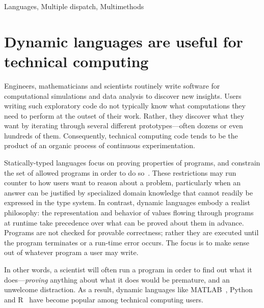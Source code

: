 \documentclass[10pt, preprint]{sigplanconf}
\begin{document}

\terms Languages, Multiple dispatch, Multimethods


\section{Dynamic languages are useful for technical computing}

Engineers, mathematicians and scientists routinely write software for
computational simulations and data analysis to discover new insights.
Users writing such exploratory code do not typically
know what computations they need to perform at the outset of their work.
Rather, they discover what they want by iterating through several different
prototypes---often dozens or even hundreds of them. Consequently, technical
computing code tends to be the product of an organic process of continuous
experimentation.

Statically-typed languages focus on proving properties of programs, and constrain
the set of allowed programs in order to do so~\cite{Pierce2002}.
These restrictions may run counter to how users want to reason about a problem,
particularly when an answer can be justified by specialized domain knowledge that
cannot readily be expressed in the type system.
In contrast, dynamic languages embody a realist philosophy:
the representation and behavior of values flowing through programs at runtime
take precedence over what can be proved about them in advance.
Programs are not checked for provable correctness;
rather they are executed until the program terminates or a run-time error occurs.
The focus is to make sense out of whatever program a user may write.

In other words, a scientist will often run a program in order to find out what
it does---\emph{proving} anything about what it does would be premature, and an
unwelcome distraction. As a result, dynamic languages like
MATLAB~\cite{matlab}, Python~\cite{pythonlib,pythonref} and R~\cite{rlang} have
become popular among technical computing users.
\end{document}
